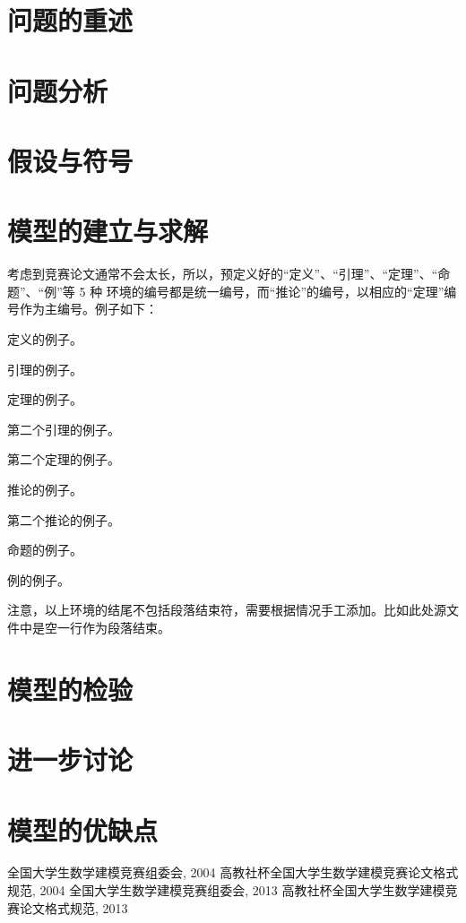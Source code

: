 \documentclass{xcumcmart}
\begin{document}
\section{问题的重述}
\section{问题分析}
\section{假设与符号}
\section{模型的建立与求解}
考虑到竞赛论文通常不会太长，所以，预定义好的“定义”、“引理”、“定理”、“命题”、“例”等 5 种
环境的编号都是统一编号，而“推论”的编号，以相应的“定理”编号作为主编号。例子如下：

\begin{definition}
  定义的例子。
\end{definition}

\begin{lemma}
  引理的例子。
\end{lemma}

\begin{theorem}
  定理的例子。
\end{theorem}

\begin{lemma}
  第二个引理的例子。
\end{lemma}

\begin{theorem}
  第二个定理的例子。
\end{theorem}

\begin{corollary}
  推论的例子。
\end{corollary}

\begin{corollary}
  第二个推论的例子。
\end{corollary}

\begin{proposition}
  命题的例子。
\end{proposition}

\begin{example}
  例的例子。
\end{example}

注意，以上环境的结尾不包括段落结束符，需要根据情况手工添加。比如此处源文件中是空一行作为段落结束。
\section{模型的检验}
\section{进一步讨论}
\section{模型的优缺点}

\begin{thebibliography}{1}
   全国大学生数学建模竞赛组委会, 2004 高教社杯全国大学生数学建模竞赛论文格式规范, 2004
   全国大学生数学建模竞赛组委会, 2013 高教社杯全国大学生数学建模竞赛论文格式规范, 2013
\end{thebibliography}
\end{document}
